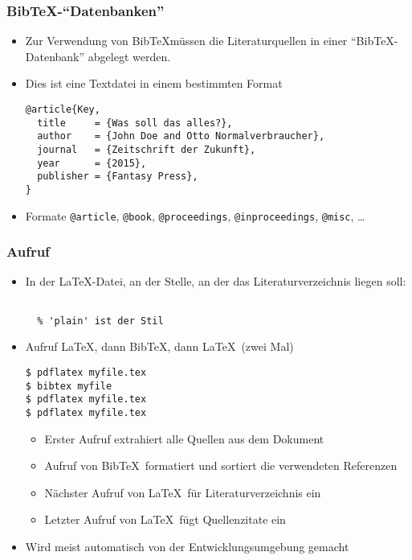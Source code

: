 \begin{frame}[fragile]
  \frametitle{Bib\TeX-\enquote{Datenbanken}}
  \onslide<+->

  \begin{itemize}
  \item<+-> Zur Verwendung von Bib\TeX müssen die Literaturquellen in
    einer \enquote{Bib\TeX-Datenbank} abgelegt werden.
  \item<+-> Dies ist eine Textdatei in einem bestimmten Format\onslide<+->%
\begin{lstlisting}
@article{Key,
  title     = {Was soll das alles?},
  author    = {John Doe and Otto Normalverbraucher},
  journal   = {Zeitschrift der Zukunft},
  year      = {2015},
  publisher = {Fantasy Press},
}
\end{lstlisting}
  \item<+-> Formate \verb|@article|, \verb|@book|, \verb|@proceedings|,
    \verb|@inproceedings|, \verb|@misc|, \dots
  \end{itemize}

\end{frame}

\begin{frame}[fragile]
  \frametitle{Aufruf}
  \onslide<+->

  \begin{itemize}
  \item<+-> In der \LaTeX-Datei, an der Stelle, an der das Literaturverzeichnis
    liegen soll:
\begin{lstlisting}

  % 'plain' ist der Stil
\end{lstlisting}
  \item<+-> Aufruf \LaTeX, dann Bib\TeX, dann \LaTeX\ (zwei Mal)
    \onslide<+->
\begin{verbatim}
$ pdflatex myfile.tex
$ bibtex myfile
$ pdflatex myfile.tex
$ pdflatex myfile.tex
\end{verbatim}
    \begin{itemize}
    \item<+-> Erster Aufruf extrahiert alle Quellen aus dem Dokument
    \item<+-> Aufruf von Bib\TeX\ formatiert und sortiert die
      verwendeten Referenzen
    \item<+-> Nächster Aufruf von \LaTeX\ für Literaturverzeichnis ein
    \item<+-> Letzter Aufruf von \LaTeX\ fügt Quellenzitate ein
    \end{itemize}
  \item<+-> Wird meist automatisch von der Entwicklungsumgebung gemacht
  \end{itemize}

\end{frame}

